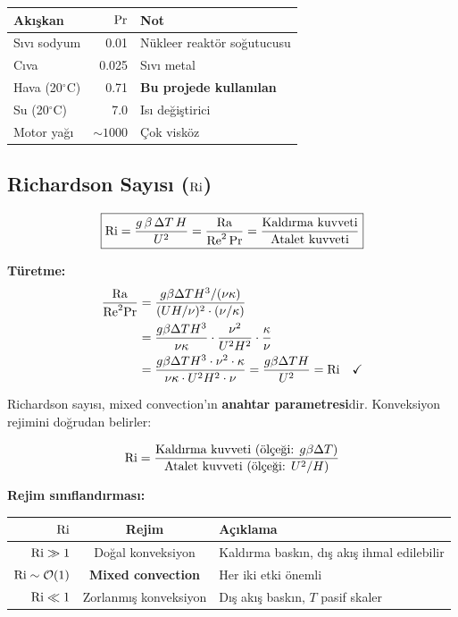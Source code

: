 \begin{center}
\begin{tabular}{lrl}
\toprule
\textbf{Akışkan} & $\mathrm{Pr}$ & \textbf{Not} \\
\midrule
Sıvı sodyum & 0.01 & Nükleer reaktör soğutucusu \\
Cıva & 0.025 & Sıvı metal \\
Hava (20$^\circ$C) & 0.71 & \textbf{Bu projede kullanılan} \\
Su (20$^\circ$C) & 7.0 & Isı değiştirici \\
Motor yağı & $\sim 1000$ & Çok visköz \\
\bottomrule
\end{tabular}
\end{center}


\subsection{Richardson Sayısı ($\mathrm{Ri}$)}
\label{subsec:richardson}

\begin{equation}
    \boxed{\mathrm{Ri} = \frac{g\,\beta\,\Delta T\,H}{U^2} = \frac{\mathrm{Ra}}{\mathrm{Re}^2\,\mathrm{Pr}} = \frac{\text{Kaldırma kuvveti}}{\text{Atalet kuvveti}}}
    \label{eq:richardson}
\end{equation}

\textbf{Türetme:}
\begin{align}
    \frac{\mathrm{Ra}}{\mathrm{Re}^2 \mathrm{Pr}} &= \frac{g\beta\Delta T H^3/(\nu\kappa)}{(UH/\nu)^2 \cdot (\nu/\kappa)} \nonumber \\
    &= \frac{g\beta\Delta T H^3}{\nu\kappa} \cdot \frac{\nu^2}{U^2 H^2} \cdot \frac{\kappa}{\nu} \nonumber \\
    &= \frac{g\beta\Delta T H^3 \cdot \nu^2 \cdot \kappa}{\nu\kappa \cdot U^2 H^2 \cdot \nu} = \frac{g\beta\Delta T H}{U^2} = \mathrm{Ri} \quad \checkmark
\end{align}

Richardson sayısı, mixed convection'ın \textbf{anahtar parametresi}dir. Konveksiyon rejimini doğrudan belirler:

\begin{equation}
    \mathrm{Ri} = \frac{\text{Kaldırma kuvveti (ölçeği: } g\beta\Delta T)}{\text{Atalet kuvveti (ölçeği: } U^2/H)}
\end{equation}

\textbf{Rejim sınıflandırması:}
\begin{center}
\begin{tabular}{rcl}
\toprule
$\mathrm{Ri}$ & \textbf{Rejim} & \textbf{Açıklama} \\
\midrule
$\mathrm{Ri} \gg 1$ & Doğal konveksiyon & Kaldırma baskın, dış akış ihmal edilebilir \\
$\mathrm{Ri} \sim \mathcal{O}(1)$ & \textbf{Mixed convection} & Her iki etki önemli \\
$\mathrm{Ri} \ll 1$ & Zorlanmış konveksiyon & Dış akış baskın, $T$ pasif skaler \\
\bottomrule
\end{tabular}
\end{center}

